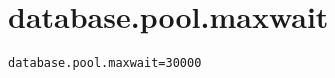 \section{database.pool.maxwait}
\label{configuration:DatabasePoolMaxwait}
\AvailableInJavaOnly{\TODO}
\begin{lstlisting}[style=Props,caption={Usage example for \textit{database.pool.maxwait}}]
database.pool.maxwait=30000
\end{lstlisting}